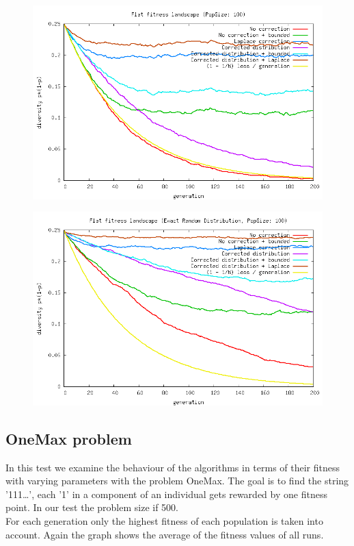 \documentclass[a4paper,twoside]{report}
\begin{document}
\begin{figure}[htp]
\includegraphics[scale=0.5]{graph_haystack006_diversity.png}
\end{figure}
\begin{figure}[htp]
\includegraphics[scale=0.5]{graph_haystack007_diversity.png}
\end{figure}

\newpage
\subsection{OneMax problem}

In this test we examine the behaviour of the algorithms in terms of their fitness with varying parameters with the problem OneMax. The goal is to find the string '111\dots', each '1' in a component of an individual gets rewarded by one fitness point. In our test the problem size if 500.\\
For each generation only the highest fitness of each population is taken into account. Again the graph shows the average of the fitness values of all runs.\\
\end{document}
